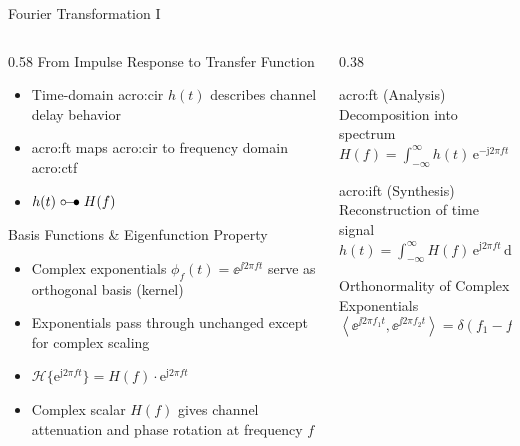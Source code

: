 \begin{frame}{Fourier Transformation I}
  \begin{columns}[T,onlytextwidth]
    \begin{column}{0.58\textwidth}
      From Impulse Response to Transfer Function\\
      \begin{itemize}
        \item Time-domain \gls{acro:cir} $h(t)$ describes channel delay behavior
        \item \Gls{acro:ft} maps \gls{acro:cir} to frequency domain \gls{acro:ctf}
        \item $h(t) \mathrel{\circ}\mathrel{\!}\mathrel{-}\mathrel{\!}\mathrel{\bullet} H(f)$
      \end{itemize}
      Basis Functions \& Eigenfunction Property\\
      \begin{itemize}
        \item Complex exponentials $\phi_f(t) = \ee^{\jj 2\pi f t}$ serve as orthogonal basis (kernel)
        \item Exponentials pass through unchanged except for complex scaling
        \item $\mathcal{H}\{\mathrm{e}^{\mathrm{j} 2\pi f t}\} = H(f) \cdot \mathrm{e}^{\mathrm{j} 2\pi f t}$
        \item Complex scalar $H(f)$ gives channel attenuation and phase rotation at frequency $f$
      \end{itemize}
    \end{column}

    \begin{column}{0.38\textwidth}
      \begin{block}{\gls{acro:ft} (Analysis)}
        Decomposition into spectrum\\
        \vspace{0.5em}
        \centering
        $H(f) = \int_{-\infty}^{\infty} h(t) \,\mathrm{e}^{-\mathrm{j} 2\pi f t} \,\mathrm{d}t$
      \end{block}

      \begin{block}{\gls{acro:ift} (Synthesis)}
        Reconstruction of time signal\\
        \vspace{0.5em}
        \centering
        $h(t) = \int_{-\infty}^{\infty} H(f) \,\mathrm{e}^{\mathrm{j} 2\pi f t} \,\mathrm{d}f$
      \end{block}
      \begin{block}{Orthonormality of Complex Exponentials}
        $$\left\langle \ee^{\jj 2 \pi f_1 t}, \ee^{\jj 2\pi f_2 t} \right\rangle = \delta(f_1 - f_2)$$
      \end{block}
    \end{column}
  \end{columns}
\end{frame}

